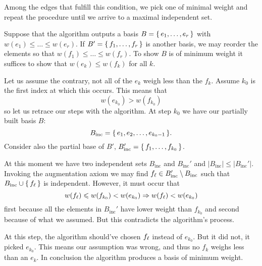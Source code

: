 \documentclass[12pt]{memoir}
\begin{document}
\begin{ptcbr}
\begin{enumerate}[i)]
        Among the edges that fulfill this condition, we pick one of minimal weight and repeat the procedure until we arrive to a maximal independent set.
    \end{enumerate}
    Suppose that the algorithm outputs a basis $B=\{\,e_1,\dots,e_r\,\}$ with $w(e_1)\leq\dots\leq w(e_r)$. If $B'=\{\,f_1,\dots,f_r\,\}$ is another basis, we may reorder the elements so that $w(f_1)\leq\dots\leq w(f_r)$. To show $B$ is of minimum weight it suffices to show that $w(e_k)\leq w(f_k)$ for all $k$.\par 
    Let us assume the contrary, not all of the $e_k$ weigh less than the $f_k$. Assume $k_0$ is the first index at which this occurs. This means that 
    $$w(e_{k_0})>w(f_{k_0})$$
    so let us retrace our steps with the algorithm. At step $k_0$ we have our partially built basis $B$:
    $$B_{\text{inc}}=\{\,e_1,e_2,\dots,e_{k_0-1}\,\}.$$
    Consider also the partial base of $B'$, $B'_{\text{inc}}=\{\,f_1,\dots,f_{k_0}\,\}$.\par 
    At this moment we have two independent sets $B_{\text{inc}}$ and $B_{\text{inc}}'$ and $|B_{\text{inc}}|\leq|B_{\text{inc}}'|$. Invoking the augmentation axiom we may find $f_\ell\in B_{\text{inc}}'\setminus B_{\text{inc}}$ such that $B_{\text{inc}}\cup\{\,f_\ell\,\}$ is independent. However, it must occur that 
    $$w(f_\ell)\leqslant w(f_{k_0})<w(e_{k_0})\Rightarrow w(f_\ell)<w(e_{k_0})$$
    first because all the elements in $B_{\text{inc}}'$ have lower weight than $f_{k_0}$ and second because of what we assumed. But this contradicts the algorithm's process.\par 
    At this step, the algorithm should've chosen $f_\ell$ instead of $e_{k_0}$. But it did not, it picked $e_{k_0}$. This means our assumption was wrong, and thus no $f_k$ weighs less than an $e_k$. In conclusion the algorithm produces a basis of minimum weight. 
\end{ptcbr}
\end{document}

